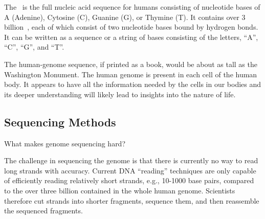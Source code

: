 \begin{definition}

The~ is the full nucleic acid sequence for humans
consisting of nucleotide bases of A (Adenine), Cytosine (C),
Guanine (G), or Thymine (T).
%
It contains over $3$ billion~, each of which consist
of two nucleotide bases bound by hydrogen bonds.
%
It can be written as a sequence or a string of bases consisting of the
letters, ``A'', ``C'', ``G'', and ``T''.
%
\end{definition}

\begin{remark}
The human-genome sequence, if printed as a book, would be
about as tall as the Washington Monument.
%
The human genome is present in each cell of the human body. 
%
It appears to have all the information needed by the cells in our
bodies and its deeper understanding will likely lead to insights into
the nature of life.
\end{remark}






\subsection{Sequencing Methods}


\begin{teachask}
What makes genome sequencing hard?
\end{teachask}
%

\begin{gram}
The challenge in sequencing the genome is that there is currently
no way to read long strands with accuracy. 
%
Current DNA ``reading'' techniques are only capable of efficiently
reading relatively short strands, e.g., 10-1000 base pairs, compared
to the over three billion contained in the whole human genome.
%
Scientists therefore cut strands into shorter fragments, sequence
them, and then reassemble the sequenced fragments.
%
\end{gram}


